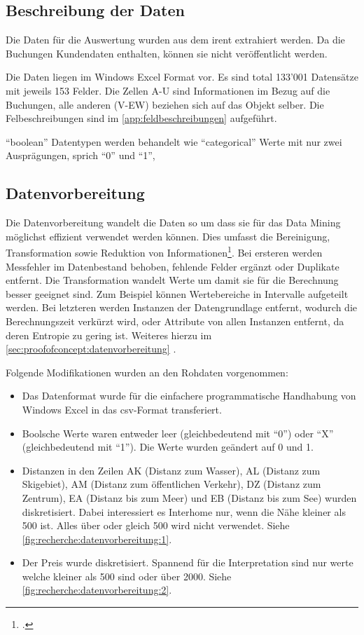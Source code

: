 \subsection{Beschreibung der Daten}
\label{sec:recherche:datenbeschaffung}
Die Daten für die Auswertung wurden aus dem \gls{irent} extrahiert werden. Da die Buchungen Kundendaten enthalten, können sie nicht veröffentlicht werden.

Die Daten liegen im Windows Excel Format vor. Es sind total 133'001 Datensätze mit jeweils 153 Felder. Die Zellen A-U sind Informationen im Bezug auf die Buchungen, alle anderen (V-EW) beziehen sich auf das Objekt selber. Die Felbeschreibungen sind im \cref{app:feldbeschreibungen} aufgeführt.

"`boolean"' Datentypen werden behandelt wie "`categorical"' Werte mit nur zwei Ausprägungen, sprich "`0"' und "`1"',

\subsection{Datenvorbereitung}
\label{sec:recherche:datenvorbereitung}
Die Datenvorbereitung wandelt die Daten so um dass sie für das Data Mining möglichst effizient verwendet werden können. Dies umfasst die Bereinigung, Transformation sowie Reduktion von Informationen\footcite{feature_selection_2017-01-04}. Bei ersteren werden Messfehler im Datenbestand behoben, fehlende Felder ergänzt oder Duplikate entfernt. Die Transformation wandelt Werte um damit sie für die Berechnung besser geeignet sind. Zum Beispiel können Wertebereiche in Intervalle aufgeteilt werden. Bei letzteren werden Instanzen der Datengrundlage entfernt, wodurch die Berechnungszeit verkürzt wird, oder Attribute von allen Instanzen entfernt, da deren Entropie zu gering ist. Weiteres hierzu im \cref{sec:proofofconcept:datenvorbereitung} . 

Folgende Modifikationen wurden an den Rohdaten vorgenommen:
\begin{itemize}
\item Das Datenformat wurde für die einfachere programmatische Handhabung von Windows Excel in das \gls{csv}-Format transferiert.
\item Boolsche Werte waren entweder leer (gleichbedeutend mit "`0"') oder "`X"' (gleichbedeutend mit "`1"'). Die Werte wurden geändert auf 0 und 1.
\item Distanzen in den Zeilen AK (Distanz zum Wasser), AL (Distanz zum Skigebiet), AM (Distanz zum öffentlichen Verkehr), DZ (Distanz zum Zentrum), EA (Distanz bis zum Meer) und EB (Distanz bis zum See) wurden diskretisiert. Dabei interessiert es Interhome nur, wenn die Nähe kleiner als 500 ist. Alles über oder gleich 500 wird nicht verwendet. Siehe \cref{fig:recherche:datenvorbereitung:1}.
\item Der Preis wurde diskretisiert. Spannend für die Interpretation sind nur werte welche kleiner als 500 sind oder über 2000. Siehe \cref{fig:recherche:datenvorbereitung:2}.
\end{itemize}

